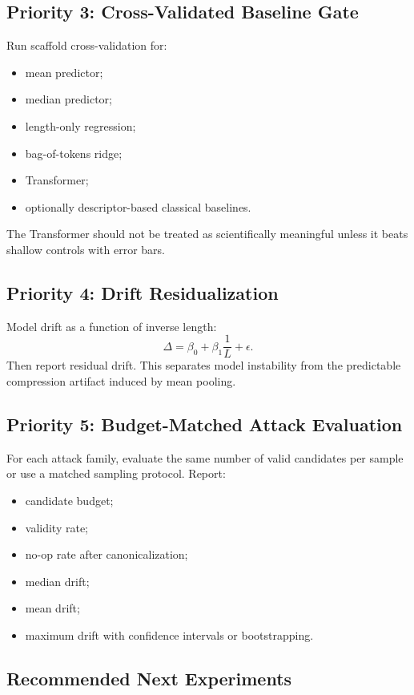 \documentclass[11pt]{article}
\begin{document}
\subsection{Priority 3: Cross-Validated Baseline Gate}

Run scaffold cross-validation for:
\begin{itemize}
  \item mean predictor;
  \item median predictor;
  \item length-only regression;
  \item bag-of-tokens ridge;
  \item Transformer;
  \item optionally descriptor-based classical baselines.
\end{itemize}

The Transformer should not be treated as scientifically meaningful unless it
beats shallow controls with error bars.

\subsection{Priority 4: Drift Residualization}

Model drift as a function of inverse length:
\[
\Delta = \beta_0 + \beta_1 \frac{1}{L} + \epsilon.
\]
Then report residual drift. This separates model instability from the predictable
compression artifact induced by mean pooling.

\subsection{Priority 5: Budget-Matched Attack Evaluation}

For each attack family, evaluate the same number of valid candidates per sample
or use a matched sampling protocol. Report:
\begin{itemize}
  \item candidate budget;
  \item validity rate;
  \item no-op rate after canonicalization;
  \item median drift;
  \item mean drift;
  \item maximum drift with confidence intervals or bootstrapping.
\end{itemize}

\subsection{Recommended Next Experiments}
\end{document}
